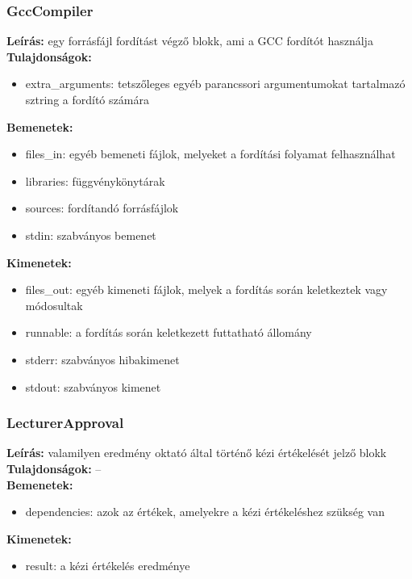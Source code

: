 \subsubsection{GccCompiler}
\textbf{Leírás:} egy forrásfájl fordítást végző blokk, ami a GCC fordítót használja \\
\textbf{Tulajdonságok:}
\begin{itemize}
    \item extra\_arguments: tetszőleges egyéb parancssori argumentumokat tartalmazó sztring a fordító számára
\end{itemize}
\textbf{Bemenetek:}
\begin{itemize}
    \item files\_in: egyéb bemeneti fájlok, melyeket a fordítási folyamat felhasználhat
    \item libraries: függvénykönytárak
    \item sources: fordítandó forrásfájlok
    \item stdin: szabványos bemenet
\end{itemize}
\textbf{Kimenetek:}
\begin{itemize}
    \item files\_out: egyéb kimeneti fájlok, melyek a fordítás során keletkeztek vagy módosultak
    \item runnable: a fordítás során keletkezett futtatható állomány
    \item stderr: szabványos hibakimenet
    \item stdout: szabványos kimenet
\end{itemize}

\subsubsection{LecturerApproval}
\textbf{Leírás:} valamilyen eredmény oktató által történő kézi értékelését jelző blokk \\
\textbf{Tulajdonságok:} -- \\
\textbf{Bemenetek:}
\begin{itemize}
    \item dependencies: azok az értékek, amelyekre a kézi értékeléshez szükség van
\end{itemize}
\textbf{Kimenetek:}
\begin{itemize}
    \item result: a kézi értékelés eredménye
\end{itemize}

